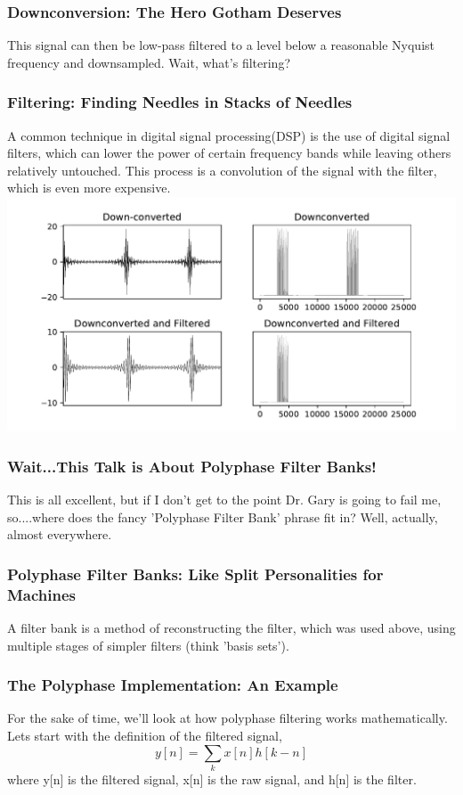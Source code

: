 \documentclass{beamer}
\begin{document}
\begin{frame}
\frametitle{Downconversion:  The Hero Gotham Deserves}
\center This signal can then be low-pass filtered to a level below a reasonable Nyquist frequency and downsampled. Wait, what's filtering?
\end{frame}

\begin{frame}
\frametitle{Filtering: Finding Needles in Stacks of Needles}
A common technique in digital signal processing(DSP) is the use of digital signal filters, which can lower the power of certain frequency bands while leaving others relatively untouched.  This process is a convolution of the signal with the filter, which is even more expensive.
\includegraphics[scale=.58]{Figure_5.pdf}
\end{frame}

\begin{frame}
\frametitle{Wait...This Talk is About Polyphase Filter Banks!}
This is all excellent, but if I don't get to the point Dr. Gary is going to fail me, so....where does the fancy 'Polyphase Filter Bank' phrase fit in? Well, actually, almost everywhere.
\end{frame}

\begin{frame}
\frametitle{Polyphase Filter Banks: Like Split Personalities for Machines}
A filter bank is a method of reconstructing the filter, which was used above, using multiple stages of simpler filters (think 'basis sets').
\end{frame}

\begin{frame}
\frametitle{The Polyphase Implementation: An Example}
For the sake of time, we'll look at how polyphase filtering works mathematically.  Lets start with the definition of the filtered signal,
\begin{equation}
y[n] = \sum_k x[n]h[k-n]
\end{equation}
where y[n] is the filtered signal, x[n] is the raw signal, and h[n] is the filter.
\end{frame}
\end{document}
